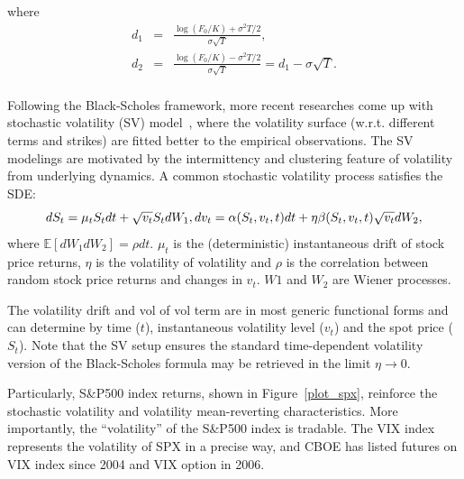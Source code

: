 \documentclass[11pt,reqno,final]{amsart}
\begin{document}
where
\begin{eqnarray*}
d_1 &=& \frac{\log(F_0/K) + \sigma^2T/2}{\sigma\sqrt{T}}, \\
d_2 &=& \frac{\log(F_0/K) - \sigma^2T/2}{\sigma\sqrt{T}} = d_1 -\sigma\sqrt{T}. \\
\end{eqnarray*}

Following the Black-Scholes framework, more recent researches come up with stochastic volatility (SV) model~\cite{Heston93,Bates96,DPS00}, where the volatility surface (w.r.t. different terms and strikes) are fitted better to the empirical observations. The SV modelings are motivated by the intermittency and clustering feature of volatility from underlying dynamics. A common stochastic volatility process satisfies the SDE:
\begin{equation*}
dS_t = \mu_t S_t dt + \sqrt{v_t} S_t dW_1, \\
dv_t = \alpha(S_t,v_t,t)dt + \eta\beta(S_t,v_t,t)\sqrt{v_t} dW_2,
\end{equation*}
where $\mathbb{E}[dW_1 dW_2]=\rho dt$. $\mu_t$ is the (deterministic) instantaneous drift of stock price returns, $\eta$ is the volatility of volatility and $\rho$ is the correlation between random stock price returns and changes in $v_t$. $W1$ and $W_2$ are Wiener processes.

The volatility drift and vol of vol term are in most generic functional forms and can determine by time ($t$), instantaneous volatility level ($v_t$) and the spot price ($S_t$). Note that the SV setup ensures the standard time-dependent volatility version of the Black-Scholes formula may be retrieved in the limit $\eta \rightarrow 0$.

Particularly, S\&P500 index returns, shown in Figure~\ref{plot_spx}, reinforce the stochastic volatility and volatility mean-reverting characteristics. More importantly, the ``volatility'' of the S\&P500 index is tradable. The VIX index represents the volatility of SPX in a precise way, and CBOE has listed futures on VIX index since 2004 and VIX option in 2006.
\end{document}
